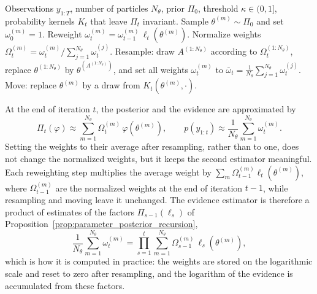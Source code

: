 \begin{algorithm}[H]
\caption{Iterated batch importance sampling (IBIS)}
\label{alg:ibis}
\begin{algorithmic}[1]
    \REQUIRE Observations $y_{1:T}$, number of particles $N_\theta$, prior $\Pi_0$, threshold $\kappa\in(0,1]$, probability kernels $K_t$ that leave $\Pi_t$ invariant.
        \STATE Sample $\theta^{(m)}\sim\Pi_0$ and set $\omega_0^{(m)} = 1$.
    \ENDFOR
            \STATE Reweight $\omega_t^{(m)} = \omega_{t-1}^{(m)}\,\ell_t(\theta^{(m)})$.
        \ENDFOR
        \STATE Normalize weights $\Omega_t^{(m)} = \omega_t^{(m)}/\sum_{j=1}^{N_\theta}\omega_t^{(j)}$.
            \STATE Resample: draw $A^{(1:N_\theta)}$ according to $\Omega_t^{(1:N_\theta)}$, replace $\theta^{(1:N_\theta)}$ by $\theta^{(A^{(1:N_\theta)})}$, and set all weights $\omega_t^{(m)}$ to $\bar{\omega}_t = \frac{1}{N_\theta}\sum_{j=1}^{N_\theta}\omega_t^{(j)}$.
                \STATE Move: replace $\theta^{(m)}$ by a draw from $K_t(\theta^{(m)},\cdot)$.
            \ENDFOR
        \ENDIF
    \ENDFOR
\end{algorithmic}
\end{algorithm}

At the end of iteration $t$, the posterior and the evidence are approximated by
\begin{equation}
    \Pi_t(\varphi)\approx\sum_{m=1}^{N_\theta}\Omega_t^{(m)}\,\varphi(\theta^{(m)}), \qquad
    p(y_{1:t})\approx\frac{1}{N_\theta}\sum_{m=1}^{N_\theta}\omega_t^{(m)}.
    \label{eq:ibis_estimators}
\end{equation}
Setting the weights to their average after resampling, rather than to one, does not change the normalized weights, but it keeps the second estimator meaningful. Each reweighting step multiplies the average weight by $\sum_m\Omega_{t-1}^{(m)}\ell_t(\theta^{(m)})$, where $\Omega_{t-1}^{(m)}$ are the normalized weights at the end of iteration $t-1$, while resampling and moving leave it unchanged. The evidence estimator is therefore a product of estimates of the factors $\Pi_{s-1}(\ell_s)$ of Proposition~\ref{prop:parameter_posterior_recursion},
\begin{equation}
    \frac{1}{N_\theta}\sum_{m=1}^{N_\theta}\omega_t^{(m)} = \prod_{s=1}^{t}\sum_{m=1}^{N_\theta}\Omega_{s-1}^{(m)}\,\ell_s(\theta^{(m)}),
\end{equation}
which is how it is computed in practice: the weights are stored on the logarithmic scale and reset to zero after resampling, and the logarithm of the evidence is accumulated from these factors.

